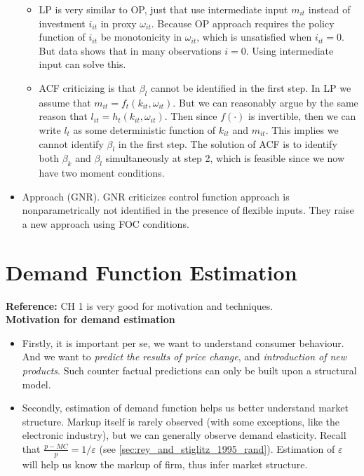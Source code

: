 \documentclass{book}
\theoremstyle{plain}
\theoremstyle{definition}
\begin{document}
\begin{itemize}
\begin{itemize}
		\item LP is very similar to OP, just that use intermediate input $m_{it}$ instead of investment $i_{it}$ in proxy $\omega_{it}$. Because OP approach requires the policy function of $i_{it}$ be monotonicity in $\omega_{it}$, which is unsatisfied when $i_{it}=0$. But data shows that in many observations $i=0$. Using intermediate input can solve this.

		\item ACF criticizing is that $\beta_l$ cannot be identified in the first step. In LP we assume that $m_{it}=f_t(k_{it},\omega_{it})$. But we can reasonably argue by the same reason that $l_{it}=h_t(k_{it},\omega_{it})$. Then since $f(\cdot)$ is invertible, then we can write $l_t$ as some deterministic function of $k_{it}$ and $m_{it}$. This implies we cannot identify $\beta_l$ in the first step. The solution of ACF is to identify both $\beta_k$ and $\beta_l$ simultaneously at step 2, which is feasible since we now have two moment conditions.
	\end{itemize}
	\item \cite{Gandhi:2017un} Approach (GNR). GNR criticizes control function approach is nonparametrically not identified in the presence of flexible inputs. They raise a new approach using FOC conditions.
\end{itemize}




\section{Demand Function Estimation} %
\label{sec:demand_function_estimation}

\noindent
\textbf{Reference:} \cite{shum:2016bk} CH 1 is very good for motivation and techniques.\\

\noindent
\textbf{Motivation for demand estimation}
\begin{itemize}
	\item Firstly, it is important per se, we want to understand consumer behaviour. And we want to \textit{predict the results of price change}, and \textit{introduction of new products}. 
	Such counter factual predictions can only be built upon a structural model.
	\item Secondly, estimation of demand function helps us better understand market structure. Markup itself is rarely observed (with some exceptions, like the electronic industry), but we can generally observe demand elasticity.
	Recall that $\frac{p-MC}{p}=1/\varepsilon$ (see \ref{sec:rey_and_stiglitz_1995_rand}). Estimation of $\varepsilon$ will help us know the markup of firm, thus infer market structure.
\end{itemize}
\end{document}
